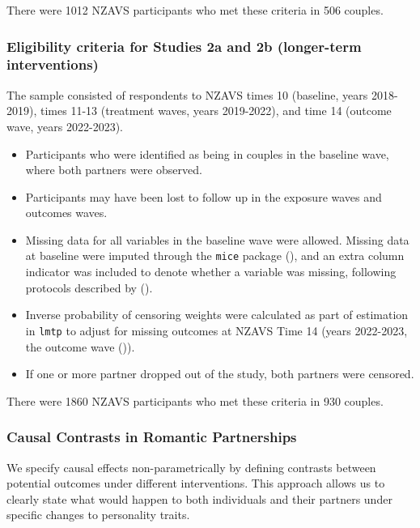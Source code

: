 \documentclass[
  singlecolumn]{article}
\providecommand{\tightlist}{%
  \setlength{\itemsep}{0pt}\setlength{\parskip}{0pt}}\usepackage{longtable,booktabs,array}
\begin{document}
There were 1012 NZAVS participants who met these criteria in 506
couples.

\subsubsection{Eligibility criteria for Studies 2a and 2b (longer-term
interventions)}\label{eligibility-criteria-for-studies-2a-and-2b-longer-term-interventions}

The sample consisted of respondents to NZAVS times 10 (baseline, years
2018-2019), times 11-13 (treatment waves, years 2019-2022), and time 14
(outcome wave, years 2022-2023).

\begin{itemize}
\tightlist
\item
  Participants who were identified as being in couples in the baseline
  wave, where both partners were observed.
\item
  Participants may have been lost to follow up in the exposure waves and
  outcomes waves.
\item
  Missing data for all variables in the baseline wave were allowed.
  Missing data at baseline were imputed through the \texttt{mice}
  package (), and an extra
  column indicator was included to denote whether a variable was
  missing, following protocols described by
  ().
\item
  Inverse probability of censoring weights were calculated as part of
  estimation in \texttt{lmtp} to adjust for missing outcomes at NZAVS
  Time 14 (years 2022-2023, the outcome wave
  ()).
\item
  If one or more partner dropped out of the study, both partners were
  censored.
\end{itemize}

There were 1860 NZAVS participants who met these criteria in 930
couples.

\subsubsection{Causal Contrasts in Romantic
Partnerships}\label{causal-contrasts-in-romantic-partnerships}

We specify causal effects non-parametrically by defining contrasts
between potential outcomes under different interventions. This approach
allows us to clearly state what would happen to both individuals and
their partners under specific changes to personality traits.
\end{document}
